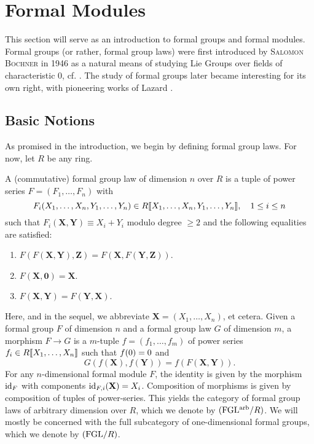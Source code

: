\documentclass[../main.tex]{subfiles}
\begin{document}
\section{Formal Modules}
This section will serve as an introduction to formal groups and 
formal modules. Formal groups (or rather, formal group laws) were first
introduced by \textsc{Salomon Bochner} in 1946 as a natural means of studying Lie
Groups over fields of characteristic $0$, cf. \cite{Bochner1946FGrps}. 
The study of formal groups later became interesting for its own right, 
with pioneering works of Lazard \cite{Lazard1955FGrps}. 

\subsection{Basic Notions} %
\label{sub:Basic Notions}
As promised in the introduction, we begin by defining {formal group
laws}.
For now, let $R$ be any ring.
\begin{defi}
  A (commutative) formal group law  of dimension
  $n$ over $R$ is a tuple of
  power series $F = (F_1, \dots, F_n)$ with $$F_i(X_1, \dots, X_n,Y_1,
  \dots, Y_n) \in R\llbracket X_1, \dots,
  X_n, Y_1, \dots, Y_n\rrbracket, \quad 1 \leq i \leq n$$
  such that $F_i(\mathbf X, \mathbf Y) \equiv X_i + Y_i $ modulo degree $\geq 2$
  and the following equalities are satisfied:
  \begin{enumerate}
    \item $F(F (\mathbf X, \mathbf Y), \mathbf Z) = 
      F(\mathbf X, F(\mathbf Y, \mathbf Z))$.
    \item $F( \mathbf X, \mathbf 0) = \mathbf X$.
    \item $F( \mathbf X, \mathbf Y) = F(\mathbf Y, \mathbf X).$
  \end{enumerate}
  Here, and in the sequel, we abbreviate $\mathbf X =
  (X_1, \dots, X_n)$, et cetera.
  Given a formal group $F$ of dimension $n$ and a formal group law
  $G$ of dimension $m$,
  a morphism $F \to G$ is a $m$-tuple $f = (f_1, \dots, f_m)$ 
  of power series $f_i \in R\llbracket X_1, \dots, X_n \rrbracket$ such that ${f}(0)=0$ and
  \begin{equation*}
    G(f( \mathbf X), f( \mathbf Y) ) = f(F( \mathbf X, \mathbf Y)).
  \end{equation*}
  For any $n$-dimensional formal module $F$, the identity is given by 
  the morphism $\operatorname{id}_{F}$ with components $\operatorname{id}_{F,i}( \mathbf X) = X_i$. 
  Composition of morphisms is given by composition of tuples of power-series.
  This yields the category of formal group laws of arbitrary dimension over $R$,
  which we denote by ${(\mathrm{FGL^{arb}}/{R})}$. We will mostly be concerned with the full
  subcategory of one-dimensional formal groups, which we denote by ${(\mathrm{FGL}/{R})}$. 
\end{defi}
\end{document}
